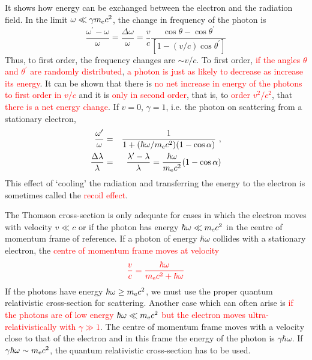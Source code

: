 \documentclass[12pt,a4paper]{article}
\begin{document}
It shows how energy can be exchanged between the electron and the radiation field. In the limit $\omega \ll \gamma m_{\rm e}c^2$, the change in frequency of the photon is
\begin{equation}
\frac{\omega^{\prime} -\omega}{\omega} = \frac{\Delta \omega}{\omega} = \frac{v}{c} \frac{\cos\theta - \cos \theta^{\prime} }{[1-(v/c)\cos \theta^{\prime}]}
\end{equation}
Thus, to first order, the frequency changes are $\sim v/c$. To first order, \textcolor{red}{if the angles $\theta$ and $\theta^{\prime}$ are randomly distributed}, \textcolor{red}{a photon is just as likely to decrease as increase its energy}. It can be shown that there is \textcolor{red}{no net increase in energy of the photons to first order in $v/c$} and it is \textcolor{red}{only in second order}, that is, to \textcolor{red}{order $v^2/c^2$}, that \textcolor{red}{there is a net energy change}.
If $v = 0$, $\gamma = 1$, i.e. the photon on scattering from a stationary electron, 
\begin{eqnarray}
\frac{\omega^{\prime}}{\omega} &=& \frac{1}{1+(\hbar\omega/m_{\rm e} c^2)(1-\cos \alpha)} ~, \\
\frac{\Delta \lambda}{\lambda} &=& \frac{\lambda^{\prime} -\lambda}{\lambda} = \frac{\hbar \omega}{m_{\rm e}c^2} (1-\cos \alpha)
\end{eqnarray}
This effect of ‘cooling’ the radiation and transferring the energy to the electron is sometimes called the \textcolor{red}{recoil effect}.

The Thomson cross-section is only adequate for cases in which the electron moves with velocity $v \ll c$ or if the photon has energy $\hbar \omega \ll m_{\rm e}c^2$ in the centre of momentum frame of reference. If a photon of energy $\hbar \omega$ collides with a stationary electron, the \textcolor{red}{centre of momentum frame moves at velocity}
\begin{equation}
\color{red} \frac{v}{c} = \frac{\hbar \omega}{m_{\rm e} c^2 +\hbar \omega}
\end{equation}
If the photons have energy \textcolor{red}{$\hbar \omega \geq m_{\rm e} c^2$}, we must use the proper quantum relativistic cross-section for scattering. Another case which can often arise is \textcolor{red}{if the photons are of low energy $\hbar \omega \ll  m_{\rm e} c^2$ but the electron moves ultra-relativistically with $\gamma \gg 1$}. The centre of momentum frame moves with a velocity close to that of the electron and in this frame the energy of the photon is $\gamma \hbar \omega$. If $\gamma \hbar \omega \sim m_{\rm e}c^2$, the quantum relativistic cross-section has to be used.
\end{document}
